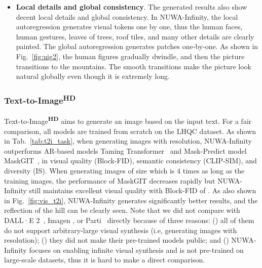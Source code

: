 \documentclass{article}
\begin{document}
\begin{itemize}[leftmargin=*]
\item \textbf{Local details and global consistency}. The generated results also show decent local details and global consistency. In NUWA-Infinity, the local autoregression generates visual tokens one by one, thus the human faces, human gestures, leaves of trees, roof tiles, and many other details are clearly painted. The global autoregression generates patches one-by-one. As shown in Fig.~\ref{fig:uig2}, the human figures gradually dwindle, and then the picture transitions to the mountains. The smooth transitions make the picture look natural globally even though it is extremely long.

\end{itemize}


























\subsubsection{Text-to-Image\textsuperscript{\textbf{HD}}}
Text-to-Image\textsuperscript{\textbf{HD}} aims to generate an image based on the input text. For a fair comparison, all models are trained from scratch on the LHQC dataset. As shown in Tab.~\ref{tab:t2i_task}, when generating images with  resolution, NUWA-Infinity outperforms AR-based models Taming Transformer~\cite{esserTamingTransformersHighResolution2021} and Mask-Predict model MaskGIT~\cite{changMaskGITMaskedGenerative2022}, in visual quality (Block-FID), semantic consistency (CLIP-SIM), and diversity (IS). When generating images of size   which is 4 times as long as the training images, the performance of MaskGIT \cite{changMaskGITMaskedGenerative2022} decreases rapidly but NUWA-Infinity still maintains excellent visual quality with Block-FID of . As also shown in Fig.~\ref{fig:vis_t2i}, NUWA-Infinity generates significantly better results, and the reflection of the hill can be clearly seen. Note that we did not compare with DALL·E 2~\cite{rameshHierarchicalTextConditionalImage2022}, Imagen \cite{sahariaPhotorealisticTexttoImageDiffusion2022}, or Parti~\cite{yuScalingAutoregressiveModels2022} directly because of three reasons: () all of them do not support arbitrary-large visual synthesis (i.e, generating images with  resolution);  () they did not make their pre-trained models public; and () NUWA-Infinity focuses on enabling infinite visual synthesis and is not pre-trained on large-scale datasets, thus it is hard to make a direct comparison.
\end{document}
